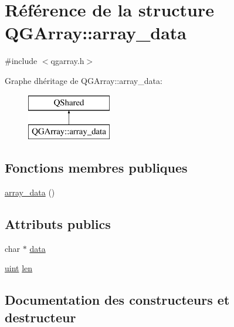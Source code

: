 \hypertarget{struct_q_g_array_1_1array__data}{}\section{Référence de la structure Q\+G\+Array\+:\+:array\+\_\+data}
\label{struct_q_g_array_1_1array__data}


{\ttfamily \#include $<$qgarray.\+h$>$}

Graphe d\textquotesingle{}héritage de Q\+G\+Array\+:\+:array\+\_\+data\+:\begin{figure}[H]
\begin{center}
\leavevmode
\includegraphics[height=2.000000cm]{struct_q_g_array_1_1array__data}
\end{center}
\end{figure}
\subsection*{Fonctions membres publiques}
\begin{DoxyCompactItemize}
\item 
\hyperlink{struct_q_g_array_1_1array__data_a6853f9266381a3b2cde42d5502e2af8d}{array\+\_\+data} ()
\end{DoxyCompactItemize}
\subsection*{Attributs publics}
\begin{DoxyCompactItemize}
\item 
char $\ast$ \hyperlink{struct_q_g_array_1_1array__data_adbe9afac5546534042f333048906fe7a}{data}
\item 
\hyperlink{qglobal_8h_a4d3943ddea65db7163a58e6c7e8df95a}{uint} \hyperlink{struct_q_g_array_1_1array__data_a08ad3a7d964f21f6f5b8b33056892bbc}{len}
\end{DoxyCompactItemize}


\subsection{Documentation des constructeurs et destructeur}
\hypertarget{struct_q_g_array_1_1array__data_a6853f9266381a3b2cde42d5502e2af8d}{}
